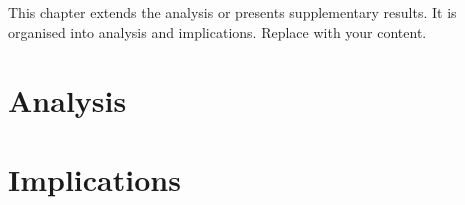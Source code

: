 %

This chapter extends the analysis or presents supplementary results. It is organised into analysis and implications. Replace with your content.

\lipsum[43-44]

\section{Analysis}\label{sec:further-analysis}

\lipsum[45-47]

\section{Implications}\label{sec:further-implications}

\lipsum[48-50]
